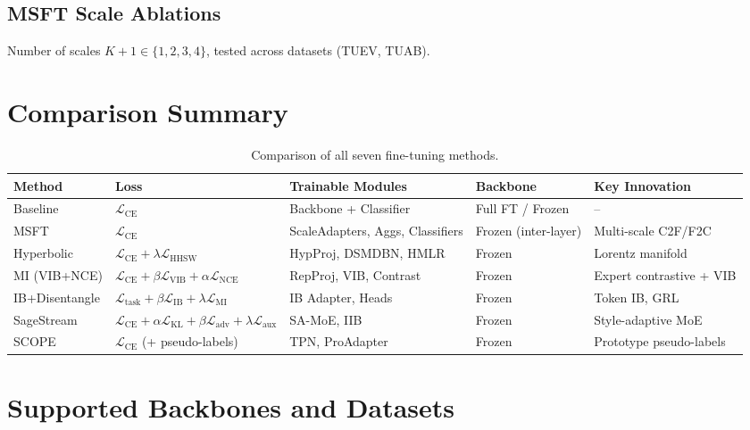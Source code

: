 \documentclass{article}
\newcommand{\mL}{\mathcal{L}}
\begin{document}
\subsection{MSFT Scale Ablations}

Number of scales $K+1 \in \{1, 2, 3, 4\}$, tested across datasets (TUEV, TUAB).

\section{Comparison Summary}
\label{sec:comparison}

\begin{table}[h]
\centering
\small
\setlength{\tabcolsep}{2.5pt}
\begin{tabular}{@{}p{1.8cm}p{3.5cm}p{2.5cm}p{2.0cm}p{3.0cm}@{}}
\toprule
Method & Loss & Trainable Modules & Backbone & Key Innovation \\
\midrule
Baseline & $\mL_\text{CE}$ & Backbone + Classifier & Full FT / Frozen & -- \\
\addlinespace
MSFT & $\mL_\text{CE}$ & ScaleAdapters, Aggs, Classifiers & Frozen (inter-layer) & Multi-scale C2F/F2C \\
\addlinespace
Hyperbolic & $\mL_\text{CE} + \lambda \mL_\text{HHSW}$ & HypProj, DSMDBN, HMLR & Frozen & Lorentz manifold \\
\addlinespace
MI (VIB+NCE) & $\mL_\text{CE} + \beta \mL_\text{VIB} + \alpha \mL_\text{NCE}$ & RepProj, VIB, Contrast & Frozen & Expert contrastive + VIB \\
\addlinespace
IB+Disentangle & $\mL_\text{task} + \beta \mL_\text{IB} + \lambda \mL_\text{MI}$ & IB Adapter, Heads & Frozen & Token IB, GRL \\
\addlinespace
SageStream & $\mL_\text{CE} + \alpha \mL_\text{KL} + \beta \mL_\text{adv} + \lambda \mL_\text{aux}$ & SA-MoE, IIB & Frozen & Style-adaptive MoE \\
\addlinespace
SCOPE & $\mL_\text{CE}$ (+ pseudo-labels) & TPN, ProAdapter & Frozen & Prototype pseudo-labels \\
\bottomrule
\end{tabular}
\caption{Comparison of all seven fine-tuning methods.}
\end{table}

\section{Supported Backbones and Datasets}
\label{sec:support}
\end{document}
